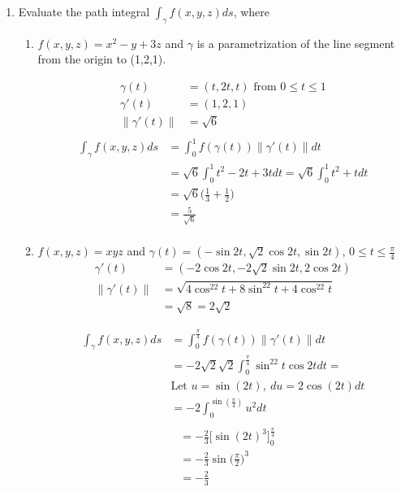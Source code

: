 \documentclass{article}
\newcommand{\norm}[1]{\| #1 \|}
\begin{document}
\begin{enumerate}
\newpage
\item Evaluate the path integral $\displaystyle \int_{\gamma}f(x,y,z)ds$, where
\begin{enumerate}
    \item $f(x,y,z) = x^2 - y + 3z$ and $\gamma$ is a parametrization of the line segment from the origin to (1,2,1).
    \begin{multicols}{2} 
    \noindent
    \begin{align*} 
        \gamma(t) &= (t,2t,t) \text{ from } 0 \leq t \leq 1 \\
        \gamma'(t) &= (1, 2, 1) \\
        \norm{\gamma'(t)} &= \sqrt{6} \\
    \end{align*}
    \begin{align*} 
        \int_{\gamma}f(x,y,z)ds &= \int_0^1 f(\gamma(t)) \norm{\gamma'(t)}dt \\
        &= \sqrt{6} \int_0^1 t^2 - 2t + 3 t dt = \sqrt{6} \int_0^1 t^2 + t dt \\
        &= \sqrt{6} \Big(\frac{1}{3} + \frac{1}{2}\Big) \\
        &= \frac{5}{\sqrt{6}} \\
    \end{align*}
    \end{multicols}
    \item $f(x,y,z) = xyz$ and $\gamma(t) = (-\sin 2t, \sqrt{2} \cos 2t, \sin 2t)$, $\displaystyle 0 \leq t \leq \frac{\pi}{4}$
    \begin{align*} 
        \gamma'(t) &= (-2\cos 2t, -2\sqrt2\sin 2t, 2\cos 2t) \\
        \norm{\gamma'(t)} &= \sqrt{4\cos^22t+8\sin^22t+4\cos^22t} \\
        &= \sqrt{8} = 2\sqrt{2}
    \end{align*}
    \begin{multicols}{2} 
    \noindent
    \begin{align*} 
        \int_{\gamma}f(x,y,z)ds &= \int_0^{\frac{\pi}{4}} f(\gamma(t)) \norm{\gamma'(t)}dt \\
        &= -2\sqrt{2}\sqrt{2} \int_0^{\frac{\pi}{4}} \sin^22t \cos 2t dt = \\
        &\text{Let } u = \sin(2t),\: du = 2\cos(2t)dt \\
        &= -2 \int_0^{\sin(\frac{\pi}{4})} u^2 dt \\
    \end{align*}
    \begin{align*} 
        &= -\frac{2}{3} \Big[\sin(2t)^3\Big]_0^{\frac{\pi}{4}} \\
        &= -\frac{2}{3} \sin\Big(\frac{\pi}{2}\Big)^3 \\
        &= -\frac{2}{3} \\
    \end{align*}
    \end{multicols}
    

\end{enumerate}
\end{enumerate}
\end{document}
